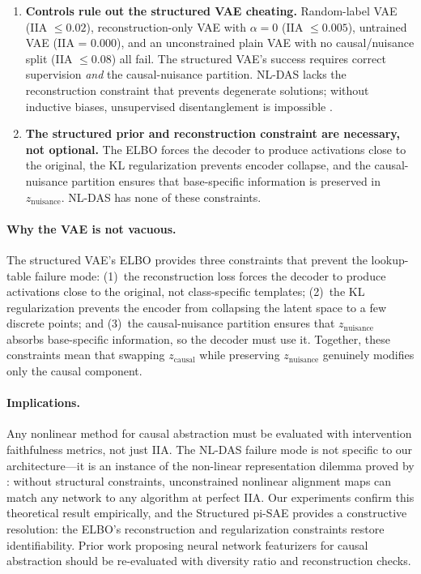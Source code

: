 \documentclass{article}
\begin{document}
\begin{enumerate}[leftmargin=*]
\item \textbf{Controls rule out the structured VAE cheating.} Random-label VAE
  (IIA $\leq 0.02$), reconstruction-only VAE with $\alpha = 0$
  (IIA $\leq 0.005$), untrained VAE (IIA = 0.000), and an unconstrained plain
  VAE with no causal/nuisance split (IIA $\leq 0.08$) all fail. The structured
  VAE's success requires correct supervision \emph{and} the
  causal-nuisance partition. NL-DAS lacks the reconstruction constraint
  that prevents degenerate solutions; without inductive biases, unsupervised
  disentanglement is impossible \citep{locatello2019challenging}.

\item \textbf{The structured prior and reconstruction constraint are
  necessary, not optional.} The ELBO forces the decoder to produce
  activations close to the original, the KL regularization prevents
  encoder collapse, and the causal-nuisance partition ensures that
  base-specific information is preserved in $z_\text{nuisance}$.
  NL-DAS has none of these constraints.
\end{enumerate}

\paragraph{Why the VAE is not vacuous.}
The structured VAE's ELBO provides three constraints that prevent the
lookup-table failure mode: (1)~the reconstruction loss forces the decoder to
produce activations close to the original, not class-specific templates;
(2)~the KL regularization prevents the encoder from collapsing the latent space
to a few discrete points; and (3)~the causal-nuisance partition ensures that
$z_\text{nuisance}$ absorbs base-specific information, so the decoder must use
it. Together, these constraints mean that swapping $z_\text{causal}$ while
preserving $z_\text{nuisance}$ genuinely modifies only the causal component.

\paragraph{Implications.}
Any nonlinear method for causal abstraction must be evaluated with intervention
faithfulness metrics, not just IIA. The NL-DAS failure mode is not specific to
our architecture---it is an instance of the non-linear representation dilemma
proved by \citet{sutter2025nonlinear}: without structural constraints,
unconstrained nonlinear alignment maps can match any network to any algorithm
at perfect IIA. Our experiments confirm this theoretical result empirically,
and the Structured pi-SAE provides a constructive resolution: the ELBO's
reconstruction and regularization constraints restore identifiability.
Prior work proposing neural network featurizers for causal abstraction
\citep{geiger2024causal} should be re-evaluated with diversity ratio and
reconstruction checks.
\end{document}
